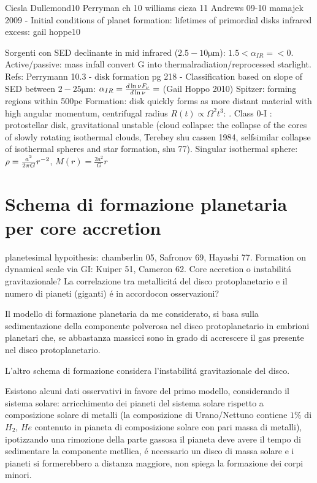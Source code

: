 \begin{workout}
Ciesla Dullemond10 
Perryman ch 10
williams cieza 11
Andrews 09-10
mamajek 2009 - Initial conditions of planet formation: lifetimes of primordial disks
infrared excess: gail hoppe10
\end{workout}

\begin{workout}
Sorgenti con SED declinante in mid infrared ($2.5-10\si{\micro\meter}$): $1.5<\alpha_{IR}=<0$. Active/passive: mass infall convert G into thermalradiation/reprocessed starlight.
Refs: Perrymann 10.3 - disk formation pg 218 - 
Classification based on slope of SED between $2-25\si{\micro\meter}$: $\alpha_{IR}=\frac{d \ln{\nu F_{\nu}}}{d \ln{\nu}}=$ (Gail Hoppo 2010)
Spitzer: forming regions within 500pc
Formation: disk quickly forms as more distant material with high angular momentum, centrifugal radius $R(t)\propto\Omega^2 t^3$: . Class 0-I : protostellar disk, gravitational unstable (cloud collapse: the collapse of the cores of slowly rotating isothermal clouds, Terebey shu cassen 1984, selfsimilar collapse of isothermal spheres and star formation, shu 77). Singular isothermal sphere: $\rho=\frac{a^2}{2\pi G}r^{-2}$, $M(r)=\frac{2a^2}{G}r$
\end{workout}


{\let\clearpage\relax\let\cleardoublepage\relax
\chapter{Schema di formazione planetaria per core accretion}
}

\begin{workout}[Refs GI vs CA]
planetesimal hypoithesis: chamberlin 05, Safronov 69, Hayashi 77. Formation on dynamical scale via GI: Kuiper 51, Cameron 62.
Core accretion o instabilit\'a gravitazionale?
La correlazione tra metallicit\'a del disco protoplanetario e il numero di pianeti (giganti) \'e in accordocon osservazioni?
\end{workout}


Il modello di formazione planetaria da me considerato, si basa sulla sedimentazione della componente polverosa nel disco protoplanetario in embrioni planetari che, se abbastanza massicci sono in grado di accrescere il gas presente nel disco protoplanetario.

L'altro schema di formazione considera l'instabilit\'a gravitazionale del disco. 

Esistono alcuni dati osservativi in favore del primo modello, considerando il sistema solare: arricchimento dei pianeti del sistema solare rispetto a composizione solare di metalli (la composizione di Urano/Nettuno contiene $1\%$ di $H_2$, $He$ contenuto in pianeta di composizione solare con pari massa di metalli), ipotizzando una rimozione della parte gassosa il pianeta deve avere il tempo di sedimentare la componente metllica, \'e necessario un disco di massa solare e i pianeti si formerebbero a distanza maggiore, non spiega la formazione dei corpi minori.

